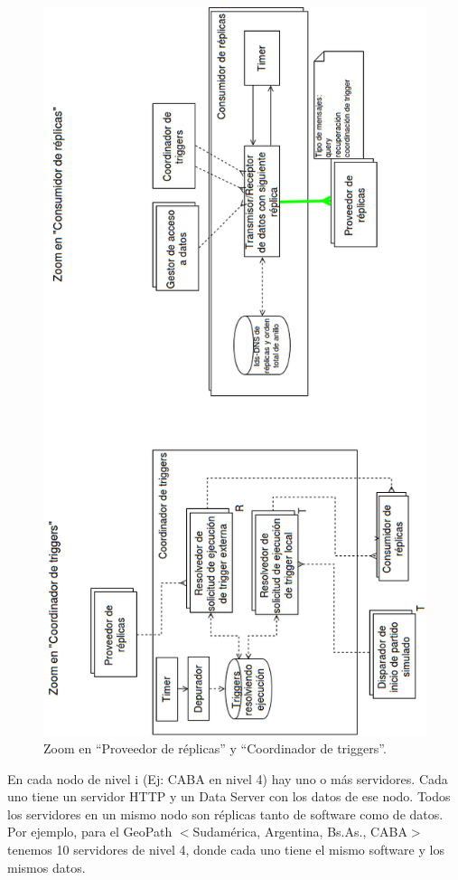 \begin{figure}[H]
   \centering
   \includegraphics[height=0.93\textheight]{reentrega/imagenes/admDatos-zoom2.png}
   \caption{Zoom en ``Proveedor de réplicas'' y ``Coordinador de triggers''.}
\end{figure}

En cada nodo de nivel i (Ej: CABA en nivel 4) hay uno o más servidores. Cada uno tiene un servidor HTTP  y un Data Server con los datos de ese nodo. Todos los servidores en un mismo nodo son réplicas tanto de software como de datos. Por ejemplo, para el GeoPath $<$Sudamérica, Argentina, Bs.As., CABA$>$ tenemos 10 servidores de nivel 4, donde cada uno tiene el mismo software y los mismos datos.

